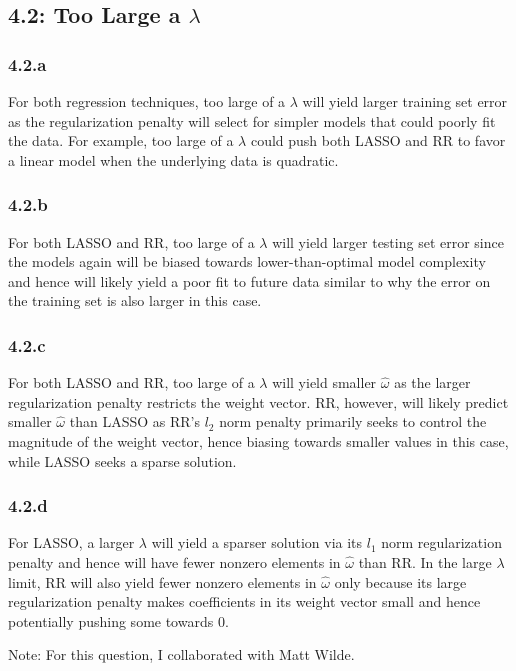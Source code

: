 \documentclass[12pt]{amsart}
\begin{document}
\subsection*{4.2: Too Large a $\lambda$}
\subsubsection*{4.2.a}
For both regression techniques, too large of a $\lambda$ will yield larger training set error as the regularization penalty will select for simpler models that could poorly fit the data.  For example, too large of a $\lambda$ could push both LASSO and RR to favor a linear model when the underlying data is quadratic.

\subsubsection*{4.2.b}
For both LASSO and RR, too large of a $\lambda$ will yield larger testing set error since the models again will be biased towards lower-than-optimal model complexity and hence will likely yield a poor fit to future data similar to why the error on the training set is also larger in this case.

\subsubsection*{4.2.c}
For both LASSO and RR, too large of a $\lambda$ will yield smaller $\hat{\omega}$ as the larger regularization penalty restricts the weight vector.  RR, however, will likely predict smaller $\hat{\omega}$ than LASSO as RR's $l_2$ norm penalty primarily seeks to control the magnitude of the weight vector, hence biasing towards smaller values in this case, while LASSO seeks a sparse solution.

\subsubsection*{4.2.d}
For LASSO, a larger $\lambda$ will yield a sparser solution via its $l_1$ norm regularization penalty and hence will have fewer nonzero elements in $\hat{\omega}$ than RR.  In the large $\lambda$ limit, RR will also yield fewer nonzero elements in $\hat{\omega}$ only because its large regularization penalty makes coefficients in its weight vector small and hence potentially pushing some towards 0.

Note: For this question, I collaborated with Matt Wilde.
\end{document}
